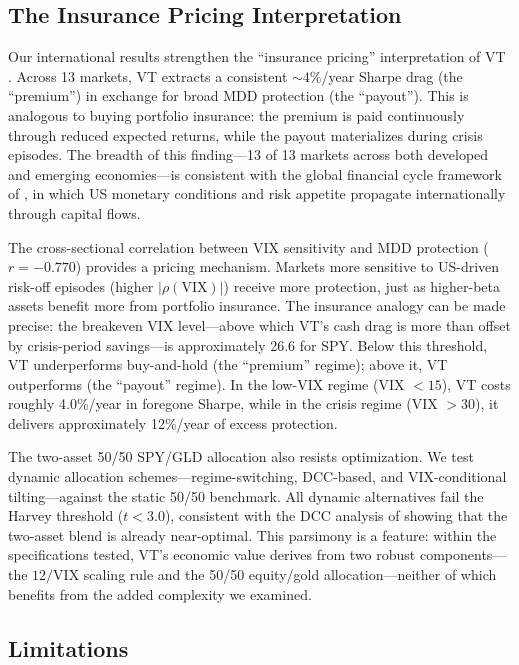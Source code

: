 \subsection{The Insurance Pricing Interpretation}

Our international results strengthen the ``insurance pricing'' interpretation of VT \citep{lai2026a}. Across 13 markets, VT extracts a consistent ${\sim}4\%$/year Sharpe drag (the ``premium'') in exchange for broad MDD protection (the ``payout''). This is analogous to buying portfolio insurance: the premium is paid continuously through reduced expected returns, while the payout materializes during crisis episodes. The breadth of this finding---13 of 13 markets across both developed and emerging economies---is consistent with the global financial cycle framework of \citet{miranda2020}, in which US monetary conditions and risk appetite propagate internationally through capital flows.

The cross-sectional correlation between VIX sensitivity and MDD protection ($r = -0.770$) provides a pricing mechanism. Markets more sensitive to US-driven risk-off episodes (higher $|\rho(\text{VIX})|$) receive more protection, just as higher-beta assets benefit more from portfolio insurance. The insurance analogy can be made precise: the breakeven VIX level---above which VT's cash drag is more than offset by crisis-period savings---is approximately 26.6 for SPY. Below this threshold, VT underperforms buy-and-hold (the ``premium'' regime); above it, VT outperforms (the ``payout'' regime). In the low-VIX regime (VIX $< 15$), VT costs roughly 4.0\%/year in foregone Sharpe, while in the crisis regime (VIX $> 30$), it delivers approximately 12\%/year of excess protection.

The two-asset 50/50 SPY/GLD allocation also resists optimization. We test dynamic allocation schemes---regime-switching, DCC-based, and VIX-conditional tilting---against the static 50/50 benchmark. All dynamic alternatives fail the Harvey threshold ($t < 3.0$), consistent with the DCC analysis of \citet{lai2026a} showing that the two-asset blend is already near-optimal. This parsimony is a feature: within the specifications tested, VT's economic value derives from two robust components---the $12/\text{VIX}$ scaling rule and the 50/50 equity/gold allocation---neither of which benefits from the added complexity we examined.

\subsection{Limitations}

